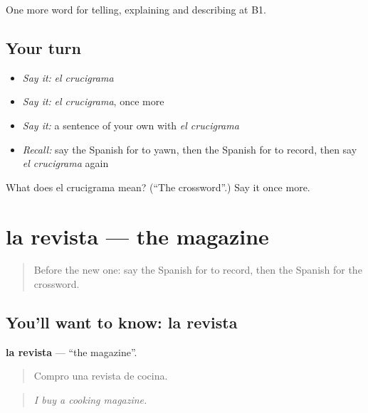 \begin{grammarlens}[title={What you've built}]
One more word for telling, explaining and describing at B1.
\end{grammarlens}

\subsection*{Your turn}
\begin{itemize}
\raggedright
  \item \emph{Say it:} \emph{el crucigrama}
  \item \emph{Say it:} \emph{el crucigrama}, once more
  \item \emph{Say it:} a sentence of your own with \emph{el crucigrama}
  \item \emph{Recall:} say the Spanish for to yawn, then the Spanish for to record, then say \emph{el crucigrama} again
\end{itemize}

\begin{tcolorbox}[breakable,colback=teal!4,colframe=teal!35!black,title={Before you move on}]
What does el crucigrama mean? (\textquotedblleft{}The crossword\textquotedblright{}.) Say it once more.
\end{tcolorbox}
\section[la revista]{la revista — the magazine}

\label{lesson:ES-C762-revista}



\begin{quote}
Before the new one: say the Spanish for to record, then the Spanish for the crossword.
\end{quote}

\subsection*{You'll want to know: la revista}
\textbf{la revista} — \textquotedblleft{}the magazine\textquotedblright{}.

\begin{quote}
Compro una revista de cocina.
\end{quote}

\begin{quote}
\emph{I buy a cooking magazine.}
\end{quote}

